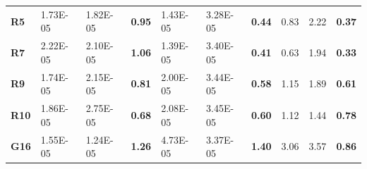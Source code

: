 \documentclass[encoding=utf8,british]{tumphthesis}
\begin{document}
\begin{table}[H]
\begin{subtable}{1\textwidth}
{\begin{tabular}{|l|llr|llr|llr|}
\rowcolor[HTML]{CFE2F3} 
\textbf{R5}                               & 1.73E-05                                             & 1.82E-05                                              & \textbf{0.95}                                    & 1.43E-05                                            & 3.28E-05                                              & \textbf{0.44}                                    & 0.83                                                 & 2.22                                                  & \textbf{0.37}                                    \\
\textbf{R7}                               & 2.22E-05                                             & 2.10E-05                                              & \textbf{1.06}                                    & 1.39E-05                                             & 3.40E-05                                              & \textbf{0.41}                                    & 0.63                                                 & 1.94                                                  & \textbf{0.33}                                    \\
\rowcolor[HTML]{CFE2F3} 
\textbf{R9}                               & 1.74E-05                                             & 2.15E-05                                              & \textbf{0.81}                                    & 2.00E-05                                             & 3.44E-05                                              & \textbf{0.58}                                    & 1.15                                                 & 1.89                                                  & \textbf{0.61}                                    \\
\textbf{R10}                              & 1.86E-05                                             & 2.75E-05                                              & \textbf{0.68}                                    & 2.08E-05                                             & 3.45E-05                                              & \textbf{0.60}                                    & 1.12                                                 & 1.44                                                  & \textbf{0.78}                                    \\
\rowcolor[HTML]{CFE2F3} 
\textbf{G16}                              & 1.55E-05                                             & 1.24E-05                                              & \textbf{1.26}                                    & 4.73E-05                                             & 3.37E-05                                              & \textbf{1.40}                                    & 3.06                                                 & 3.57                                                  & \textbf{0.86}                                    \\ \hline

\end{tabular}}
\end{subtable}
\end{table}
\end{document}
